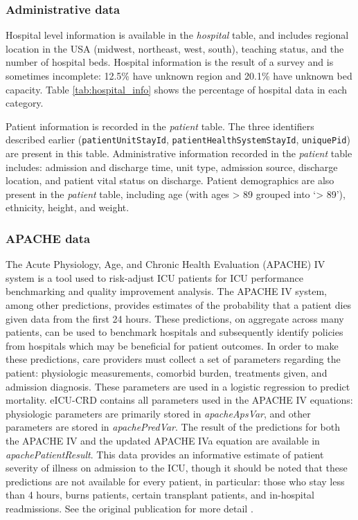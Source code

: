 \documentclass[english]{article}
\newcommand{\colname}[1]{\texttt{#1}}
\newcommand{\tblname}[1]{\emph{#1}}
\begin{document}
\subsubsection*{Administrative data}\label{administrative-data}

Hospital level information is available in the \tblname{hospital} table, and includes regional location in the USA (midwest, northeast, west, south), teaching status, and the number of hospital beds. Hospital information is the result of a survey and is sometimes incomplete: 12.5\% have unknown region and 20.1\% have unknown bed capacity. Table \ref{tab:hospital_info} shows the percentage of hospital data in each category.

Patient information is recorded in the \tblname{patient} table. The three identifiers described earlier (\colname{patientUnitStayId}, \colname{patientHealthSystemStayId}, \colname{uniquePid}) are present in this table. Administrative information recorded in the \tblname{patient} table includes: admission and discharge time, unit type, admission source, discharge location, and patient vital status on discharge. Patient demographics are also present in the \tblname{patient} table, including age (with ages \textgreater{} 89 grouped into `\textgreater{} 89'), ethnicity, height, and weight.

\subsubsection*{APACHE data}\label{apache-data}

The Acute Physiology, Age, and Chronic Health Evaluation (APACHE) IV system
\cite{zimmerman2006acute} is a tool used to risk-adjust ICU patients
for ICU performance benchmarking and quality improvement analysis. The
APACHE IV system, among other predictions, provides estimates of the
probability that a patient dies given data from the first 24 hours.
These predictions, on aggregate across many patients, can be used to
benchmark hospitals and subsequently identify policies from hospitals
which may be beneficial for patient outcomes. In order to make these
predictions, care providers must collect a set of parameters regarding
the patient: physiologic measurements, comorbid burden, treatments
given, and admission diagnosis. These parameters are used in a logistic
regression to predict mortality. eICU-CRD contains all parameters used
in the APACHE IV equations: physiologic parameters are primarily stored
in \tblname{apacheApsVar}, and other parameters are stored in
\tblname{apachePredVar}. The result of the predictions for both the
APACHE IV and the updated APACHE IVa equation are available in
\tblname{apachePatientResult}. This data provides an informative estimate
of patient severity of illness on admission to the ICU, though it should
be noted that these predictions are not available for every patient, in
particular: those who stay less than 4 hours, burns patients, certain
transplant patients, and in-hospital readmissions. See the original
publication for more detail \cite{zimmerman2006acute}.
\end{document}
